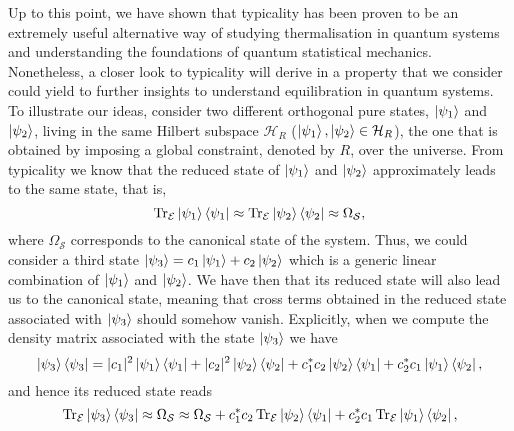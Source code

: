 \indent Up to this point, we have shown that typicality has been proven to be an extremely useful alternative way of studying thermalisation in quantum systems and understanding the foundations of quantum statistical mechanics. Nonetheless, a closer look to typicality will derive in a property that we consider could yield to further insights to understand equilibration in quantum systems. To illustrate our ideas, consider two different orthogonal pure states, $\mathinner{|{\psi_1}\rangle}$ and $\mathinner{|{\psi_2}\rangle}$, living in the same Hilbert subspace $\mathcal{H}_{R}$ ($\mathinner{|{\psi_1}\rangle},\mathinner{|{\psi_2}\rangle} \in \mathcal{H}_{R}$), the one that is obtained by imposing a global constraint, denoted by $R$, over the universe. From typicality we know that the reduced state of $\mathinner{|{\psi_1}\rangle}$ and $\mathinner{|{\psi_2}\rangle}$ approximately leads to the same state, that is, 
\begin{equation}
\operatorname{Tr}_{\mathcal{E}}\mathinner{|{\psi_1}\rangle}\mathinner{\langle{\psi_1}|}\approx\operatorname{Tr}_{\mathcal{E}}\mathinner{|{\psi_2}\rangle}\mathinner{\langle{\psi_2}|}\approx\Omega_{\mathcal{S}},
\end{equation}
where $\Omega_{\mathcal{S}}$ corresponds to the canonical state of the system.
Thus, we could consider a third state $\mathinner{|{\psi_3}\rangle} = c_1\mathinner{|{\psi_1}\rangle} + c_2\mathinner{|{\psi_2}\rangle} $ which is a generic linear combination of $\mathinner{|{\psi_1}\rangle}$ and $\mathinner{|{\psi_2}\rangle}$. We have then that its reduced state will also lead us to the canonical state, meaning that cross terms obtained in the reduced state associated with $\mathinner{|{\psi_3}\rangle}$ should somehow vanish. Explicitly, when we compute the density matrix associated with the state $\mathinner{|{\psi_3}\rangle}$ we have 
\begin{equation}
\mathinner{|{\psi_3}\rangle}\mathinner{\langle{\psi_3}|} = |c_1|^2 \mathinner{|{\psi_1}\rangle}\mathinner{\langle{\psi_1}|} + |c_2|^2 \mathinner{|{\psi_2}\rangle}\mathinner{\langle{\psi_2}|}+c_1^*c_2\mathinner{|{\psi_2}\rangle}\mathinner{\langle{\psi_1}|} + c_2^*c_1\mathinner{|{\psi_1}\rangle}\mathinner{\langle{\psi_2}|},
\end{equation}
and hence its reduced state reads
\begin{equation}
\operatorname{Tr}_{\mathcal{E}}\mathinner{|{\psi_3}\rangle}\mathinner{\langle{\psi_3}|} \approx \Omega_{\mathcal{S}}\approx \Omega_{\mathcal{S}}+c_1^*c_2\operatorname{Tr}_{\mathcal{E}}\mathinner{|{\psi_2}\rangle}\mathinner{\langle{\psi_1}|} + c_2^*c_1\operatorname{Tr}_{\mathcal{E}}\mathinner{|{\psi_1}\rangle}\mathinner{\langle{\psi_2}|},
\label{Intro:equation_super_orthogonality}
\end{equation}
